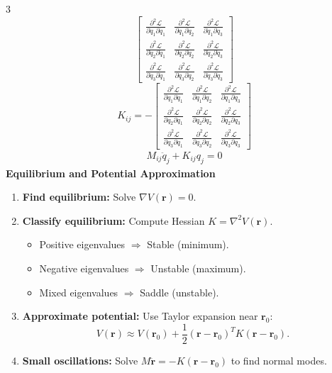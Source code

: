 \documentclass[1pt]{article}
\begin{document}
\begin{multicols}{3}
\[\begin{bmatrix}
\frac{\partial^2 \mathcal{L}}{\partial \dot{q}_1 \partial \dot{q}_1} & \frac{\partial^2 \mathcal{L}}{\partial \dot{q}_1 \partial \dot{q}_2} & \frac{\partial^2 \mathcal{L}}{\partial \dot{q}_1 \partial \dot{q}_3} \\
\frac{\partial^2 \mathcal{L}}{\partial \dot{q}_2 \partial \dot{q}_1} & \frac{\partial^2 \mathcal{L}}{\partial \dot{q}_2 \partial \dot{q}_2} & \frac{\partial^2 \mathcal{L}}{\partial \dot{q}_2 \partial \dot{q}_3} \\
\frac{\partial^2 \mathcal{L}}{\partial \dot{q}_3 \partial \dot{q}_1} & \frac{\partial^2 \mathcal{L}}{\partial \dot{q}_3 \partial \dot{q}_2} & \frac{\partial^2 \mathcal{L}}{\partial \dot{q}_3 \partial \dot{q}_3}
\end{bmatrix}
\]
\[
K_{ij} =
-\begin{bmatrix}
\frac{\partial^2 \mathcal{L}}{\partial q_1 \partial q_1} & \frac{\partial^2 \mathcal{L}}{\partial q_1 \partial q_2} & \frac{\partial^2 \mathcal{L}}{\partial q_1 \partial q_3} \\
\frac{\partial^2 \mathcal{L}}{\partial q_2 \partial q_1} & \frac{\partial^2 \mathcal{L}}{\partial q_2 \partial q_2} & \frac{\partial^2 \mathcal{L}}{\partial q_2 \partial q_3} \\
\frac{\partial^2 \mathcal{L}}{\partial q_3 \partial q_1} & \frac{\partial^2 \mathcal{L}}{\partial q_3 \partial q_2} & \frac{\partial^2 \mathcal{L}}{\partial q_3 \partial q_3}
\end{bmatrix}
\]
\begin{align*}
    M_{ij} \ddot{q}_j + K_{ij} q_j = 0
\end{align*}
\textbf{Equilibrium and Potential Approximation}
\begin{enumerate}
    \item \textbf{Find equilibrium:} Solve $\nabla V(\mathbf{r}) = 0$.
    \item \textbf{Classify equilibrium:} Compute Hessian $K = \nabla^2 V(\mathbf{r})$.
    \begin{itemize}
        \item Positive eigenvalues $\Rightarrow$ Stable (minimum).
        \item Negative eigenvalues $\Rightarrow$ Unstable (maximum).
        \item Mixed eigenvalues $\Rightarrow$ Saddle (unstable).
    \end{itemize}
    \item \textbf{Approximate potential:} Use Taylor expansion near $\mathbf{r}_0$:
    \[
    V(\mathbf{r}) \approx V(\mathbf{r}_0) + \frac{1}{2} (\mathbf{r} - \mathbf{r}_0)^T K (\mathbf{r} - \mathbf{r}_0).
    \]
    \item \textbf{Small oscillations:} Solve $M \ddot{\mathbf{r}} = -K(\mathbf{r} - \mathbf{r}_0)$ to find normal modes.
\end{enumerate}


\end{multicols}
\end{document}
